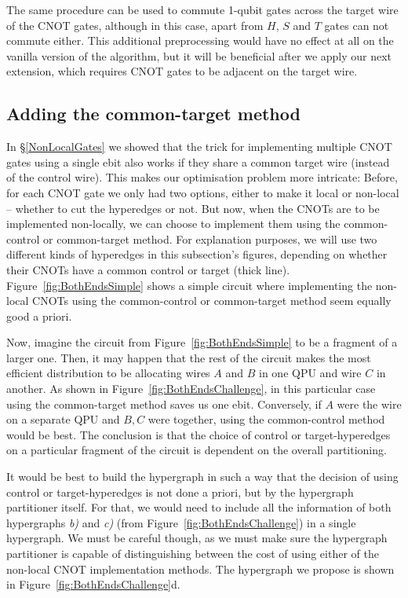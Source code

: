 

The same procedure can be used to commute 1-qubit gates across the target wire of the CNOT gates, although in this case, apart from \(H\), \(S\) and \(T\) gates can not commute either. This additional preprocessing would have no effect at all on the vanilla version of the algorithm, but it will be beneficial after we apply our next extension, which requires CNOT gates to be adjacent on the target wire.


\subsection{Adding the common-target method}
\label{BothEnds}

In \S\ref{NonLocalGates} we showed that the trick for implementing multiple CNOT gates using a single ebit also works if they share a common target wire (instead of the control wire). This makes our optimisation problem more intricate: Before, for each CNOT gate we only had two options, either to make it local or non-local -- whether to cut the hyperedges or not. But now, when the CNOTs are to be implemented non-locally, we can choose to implement them using the common-control or common-target method. For explanation purposes, we will use two different kinds of hyperedges in this subsection's figures, depending on whether their CNOTs have a common control or target (thick line). Figure~\ref{fig:BothEndsSimple} shows a simple circuit where implementing the non-local CNOTs using the common-control or common-target method seem equally good a priori. 



Now, imagine the circuit from Figure~\ref{fig:BothEndsSimple} to be a fragment of a larger one. Then, it may happen that the rest of the circuit makes the most efficient distribution to be allocating wires \(A\) and \(B\) in one QPU and wire \(C\) in another. As shown in Figure~\ref{fig:BothEndsChallenge}, in this particular case using the common-target method saves us one ebit. Conversely, if \(A\) were the wire on a separate QPU and \(B,C\) were together, using the common-control method would be best. The conclusion is that the choice of control or target-hyperedges on a particular fragment of the circuit is dependent on the overall partitioning. 

It would be best to build the hypergraph in such a way that the decision of using control or target-hyperedges is not done a priori, but by the hypergraph partitioner itself. For that, we would need to include all the information of both hypergraphs \textit{b)} and \textit{c)} (from Figure~\ref{fig:BothEndsChallenge}) in a single hypergraph. We must be careful though, as we must make sure the hypergraph partitioner is capable of distinguishing between the cost of using either of the non-local CNOT implementation methods. The hypergraph we propose is shown in Figure~\ref{fig:BothEndsChallenge}d.

